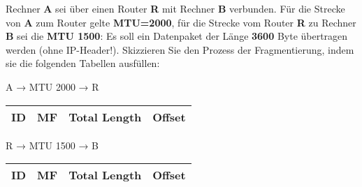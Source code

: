 
Rechner \textbf{A} sei über einen Router \textbf{R} mit Rechner \textbf{B} verbunden.
Für die Strecke von \textbf{A} zum Router gelte \textbf{MTU=2000}, für die Strecke vom Router \textbf{R} zu Rechner \textbf{B} sei die \textbf{MTU 1500}:
Es soll ein Datenpaket der Länge \textbf{3600} Byte übertragen werden (ohne IP-Header!).
Skizzieren Sie den Prozess der Fragmentierung, indem sie die folgenden Tabellen ausfüllen:

\medskip

\begin{minipage}{0.45\textwidth}
    A → MTU 2000 → R
    \centering
    \begin{tabular}{|c|c|c|c|}
        \hline
        ID & MF & Total Length & Offset \\
        \hline
    \end{tabular}
\end{minipage}
\begin{minipage}{0.45\textwidth}
    R → MTU 1500 → B
    \centering
    \begin{tabular}{|c|c|c|c|}
        \hline
        ID & MF & Total Length & Offset \\
        \hline
    \end{tabular}
\end{minipage}